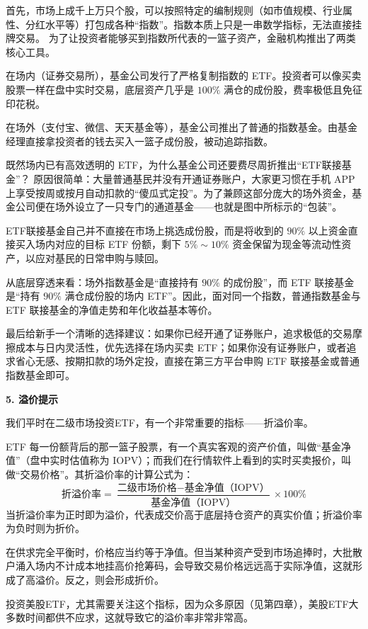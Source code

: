 \documentclass[12pt,openany]{book}
\newcommand{\subhead}[1]{%
    \par\vspace{0.5\baselineskip}%
    \noindent\textbf{#1}\par%
    \vspace{0.5\baselineskip}%
}
\begin{document}
首先，市场上成千上万只个股，可以按照特定的编制规则（如市值规模、行业属性、分红水平等）打包成各种“指数”。指数本质上只是一串数学指标，无法直接挂牌交易。
为了让投资者能够买到指数所代表的一篮子资产，金融机构推出了两类核心工具。

在场内（证券交易所），基金公司发行了严格复制指数的 ETF。投资者可以像买卖股票一样在盘中实时交易，底层资产几乎是 $100\%$ 满仓的成份股，费率极低且免征印花税。

在场外（支付宝、微信、天天基金等），基金公司推出了普通的指数基金。由基金经理直接拿投资者的钱去买入一篮子成份股，被动追踪指数。

既然场内已有高效透明的 ETF，为什么基金公司还要费尽周折推出“ETF联接基金”？
原因很简单：大量普通基民并没有开通证券账户，大家更习惯在手机 APP 上享受按周或按月自动扣款的“傻瓜式定投”。为了兼顾这部分庞大的场外资金，基金公司便在场外设立了一只专门的通道基金——也就是图中所标示的“包装”。

ETF联接基金自己并不直接在市场上挑选成份股，而是将收到的 $90\%$ 以上资金直接买入场内对应的目标 ETF 份额，剩下 $5\%\sim 10\%$ 资金保留为现金等流动性资产，以应对基民的日常申购与赎回。

从底层穿透来看：场外指数基金是“直接持有 $90\%$ 的成份股”，而 ETF 联接基金是“持有 $90\%$ 满仓成份股的场内 ETF”。因此，面对同一个指数，普通指数基金与 ETF 联接基金的净值走势和年化收益基本等价。

最后给新手一个清晰的选择建议：如果你已经开通了证券账户，追求极低的交易摩擦成本与日内灵活性，优先选择在场内买卖 ETF；如果你没有证券账户，或者追求省心无感、按期扣款的场外定投，直接在第三方平台申购 ETF 联接基金或普通指数基金即可。

\subhead{5. 溢价提示}

我们平时在二级市场投资ETF，有一个非常重要的指标——折溢价率。

ETF 每一份额背后的那一篮子股票，有一个真实客观的资产价值，叫做“基金净值”（盘中实时估值称为 IOPV）；而我们在行情软件上看到的实时买卖报价，叫做“交易价格”。其折溢价率的计算公式为：
\[
\text{折溢价率} = \frac{\text{二级市场价格} - \text{基金净值（IOPV）}}{\text{基金净值（IOPV）}} \times 100\%
\]
当折溢价率为正时即为溢价，代表成交价高于底层持仓资产的真实价值；折溢价率为负时则为折价。

在供求完全平衡时，价格应当约等于净值。但当某种资产受到市场追捧时，大批散户涌入场内不计成本地挂高价抢筹码，会导致交易价格远远高于实际净值，这就形成了高溢价。反之，则会形成折价。

投资美股ETF，尤其需要关注这个指标，因为众多原因（见第四章），美股ETF大多数时间都供不应求，这就导致它的溢价率非常非常高。
\end{document}
